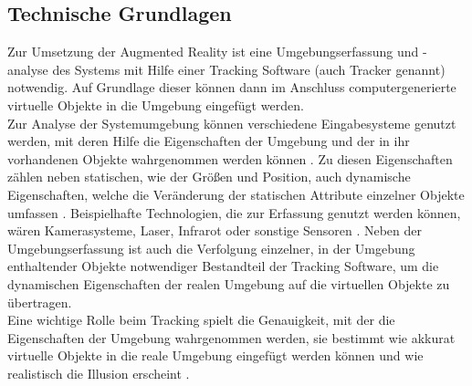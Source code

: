 \subsection{Technische Grundlagen}
Zur Umsetzung der Augmented Reality ist eine Umgebungserfassung und -analyse des Systems mit Hilfe einer Tracking Software (auch Tracker genannt) notwendig. Auf Grundlage dieser können dann im Anschluss computergenerierte virtuelle Objekte in die Umgebung eingefügt werden. \\
Zur Analyse der Systemumgebung können verschiedene Eingabesysteme genutzt werden, mit deren Hilfe die Eigenschaften der Umgebung und der in ihr vorhandenen Objekte wahrgenommen werden können \citep[S. 22]{tab:augmented-reality}. Zu diesen Eigenschaften zählen neben statischen, wie der Größen und Position, auch dynamische Eigenschaften, welche die Veränderung der statischen Attribute einzelner Objekte umfassen . Beispielhafte Technologien, die zur Erfassung genutzt werden können, wären Kamerasysteme, Laser, Infrarot oder sonstige Sensoren \citep[S. 22]{tab:augmented-reality}.
Neben der Umgebungserfassung ist auch die Verfolgung einzelner, in der Umgebung enthaltender Objekte notwendiger Bestandteil der Tracking Software, um die dynamischen Eigenschaften der realen Umgebung auf die virtuellen Objekte zu übertragen.\\
Eine wichtige Rolle beim Tracking spielt die Genauigkeit, mit der die Eigenschaften der Umgebung wahrgenommen werden, sie bestimmt wie akkurat virtuelle Objekte in die reale Umgebung eingefügt werden können und wie realistisch die Illusion erscheint \citep[S. 2]{klein:visual-tracking}. \\


